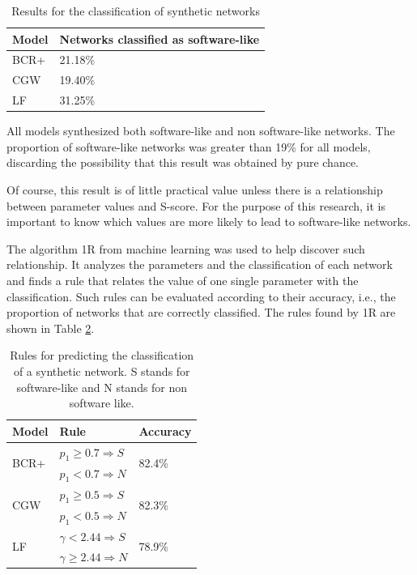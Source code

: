 \begin{table}
\caption{Results for the classification of synthetic networks}
\centering
\begin{tabular}{|l|l|}
\hline
Model & Networks classified as software-like \\
\hline 
\hline
BCR+ & 21.18\% \\ %
\hline
CGW  & 19.40\% \\  %
\hline
LF   & 31.25\% \\ %
\hline
\end{tabular}
\label{tab:results}
\end{table}

All models synthesized both software-like and non software-like networks. The
proportion of software-like networks was greater than 19\% for all models,
discarding the possibility that this result was obtained by pure chance.

%
%
%
%

Of course, this result is of little practical value unless there is a
relationship between parameter values and S-score. For the purpose of this
research, it is important to know which values are more likely to lead to
software-like networks.

The algorithm 1R \cite{OneR} from machine learning was used to help discover
such relationship. It analyzes the parameters and the classification of each
network and finds a rule that relates the value of one single parameter with the
classification. Such rules can be evaluated according to their accuracy, i.e.,
the proportion of networks that are correctly classified. The rules found by 1R
are shown in Table \ref{tab:rules}.

\begin{table}
\caption{Rules for predicting the classification of a synthetic network. S
stands for software-like and N stands for non software like.}
\centering
\begin{tabular}{|l|l|l|}
\hline
Model & Rule & Accuracy \\
\hline 
\hline
\multirow{2}{*}{BCR+}
     & $p_1 \ge 0.7 \Rightarrow S$ & \multirow{2}{*}{82.4\%}  \\ 
     & $p_1 < 0.7 \Rightarrow N$ & \\ 
\hline
\multirow{2}{*}{CGW}
     & $p_1 \ge 0.5 \Rightarrow S$ & \multirow{2}{*}{82.3\%} \\  
     & $p_1 < 0.5 \Rightarrow N$ & \\  
\hline
\multirow{2}{*}{LF}   
     & $\gamma < 2.44 \Rightarrow S$ & \multirow{2}{*}{78.9\%} \\ 
     & $\gamma \ge 2.44 \Rightarrow N$ & \\ 
\hline
\end{tabular}
\label{tab:rules}
\end{table}

